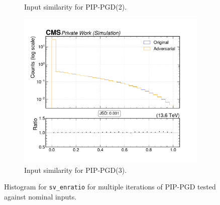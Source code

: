 \begin{figure}[htbp]
\begin{subfigure}[t]{0.32\textwidth}
    \caption*{Input similarity for PIP-PGD(2).}
  \end{subfigure}\hfill
  \begin{subfigure}[t]{0.32\textwidth}
    \includegraphics[width=\linewidth]{media/output/features/compare/combined_it_3/cmp_vtx_arr_sv_enratio.pdf}
    \caption*{Input similarity for PIP-PGD(3).}
  \end{subfigure}

  \caption*{Histogram for \texttt{sv\_enratio} for multiple iterations of PIP-PGD tested against nominal inputs.}
  \label{fig:combined_input_sv_enratio}
\end{figure}


